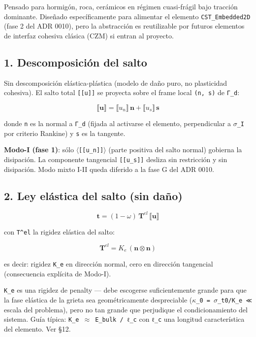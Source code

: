 \documentclass[11pt,letterpaper,oneside]{report}
\begin{document}
Pensado para hormigón, roca, cerámicos en régimen cuasi-frágil bajo tracción dominante. Diseñado específicamente para alimentar el elemento \texttt{CST\_Embedded2D} (fase 2 del ADR 0010), pero la abstracción es reutilizable por futuros elementos de interfaz cohesiva clásica (CZM) si entran al proyecto.

\subsection{1. Descomposición del salto}

Sin descomposición elástica-plástica (modelo de daño puro, no plasticidad cohesiva). El salto total \texttt{[[u]]} se proyecta sobre el frame local \texttt{(n, s)} de \texttt{Γ\_d}:

\[
\llbracket\mathbf u\rrbracket = \llbracket u_n\rrbracket\,\mathbf n + \llbracket u_s\rrbracket\,\mathbf s
\]

donde \texttt{n} es la normal a \texttt{Γ\_d} (fijada al activarse el elemento, perpendicular a \texttt{\ensuremath{\sigma}\_I} por criterio Rankine) y \texttt{s} es la tangente.

\textbf{Modo-I (fase 1)}: sólo \texttt{\ensuremath{\langle}[[u\_n]]\ensuremath{\rangle}} (parte positiva del salto normal) gobierna la disipación. La componente tangencial \texttt{[[u\_s]]} desliza sin restricción y sin disipación. Modo mixto I-II queda diferido a la fase G del ADR 0010.

\subsection{2. Ley elástica del salto (sin daño)}

\[
\mathbf t = (1 - \omega)\,\mathbf T^{el}\,\llbracket\mathbf u\rrbracket
\]

con \texttt{T\textasciicircum{}el} la rigidez elástica del salto:

\[
\mathbf T^{el} = K_e\,(\mathbf n \otimes \mathbf n)
\]

es decir: rigidez \texttt{K\_e} en dirección normal, cero en dirección tangencial (consecuencia explícita de Modo-I).

\texttt{K\_e} es una rigidez de penalty --- debe escogerse suficientemente grande para que la fase elástica de la grieta sea geométricamente despreciable (\texttt{\ensuremath{\kappa}\_0 = \ensuremath{\sigma}\_t0/K\_e ≪} escala del problema), pero no tan grande que perjudique el condicionamiento del sistema. Guía típica: \texttt{K\_e \ensuremath{\approx} E\_bulk / ℓ\_c} con \texttt{ℓ\_c} una longitud característica del elemento. Ver §12.
\end{document}
